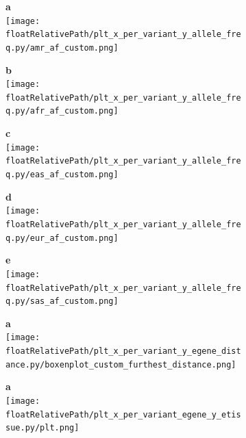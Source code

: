 \begin{figure}[!tbp]

    \begin{subfigure}[]{.49\textwidth}
        \textbf{a}
        \\
        \texttt{[image: \\floatRelativePath/plt\_x\_per\_variant\_y\_allele\_freq.py/amr\_af\_custom.png]}
    \end{subfigure}
%
    \begin{subfigure}[]{.49\textwidth}
        \textbf{b}
        \\
        \texttt{[image: \\floatRelativePath/plt\_x\_per\_variant\_y\_allele\_freq.py/afr\_af\_custom.png]}
    \end{subfigure}

    \begin{subfigure}[]{.49\textwidth}
        \textbf{c}
        \\
        \texttt{[image: \\floatRelativePath/plt\_x\_per\_variant\_y\_allele\_freq.py/eas\_af\_custom.png]}
    \end{subfigure}
%
    \centering
    \begin{subfigure}[]{.49\textwidth}
        \textbf{d}
        \\
        \texttt{[image: \\floatRelativePath/plt\_x\_per\_variant\_y\_allele\_freq.py/eur\_af\_custom.png]}
    \end{subfigure}

    \begin{subfigure}[]{.49\textwidth}
        \textbf{e}
        \\
        \texttt{[image: \\floatRelativePath/plt\_x\_per\_variant\_y\_allele\_freq.py/sas\_af\_custom.png]}
    \end{subfigure}

    \caption{}

\end{figure}


\begin{figure}[!ht]

    \begin{subfigure}[]{.49\textwidth}
        \centering
        \textbf{a}
        \\
        \texttt{[image: \\floatRelativePath/plt\_x\_per\_variant\_y\_egene\_distance.py/boxenplot\_custom\_furthest\_distance.png]}
    \end{subfigure}

    \caption{}

\end{figure}


\begin{figure}[!ht]

    \begin{subfigure}[]{.49\textwidth}
        \textbf{a}
        \\
        \texttt{[image: \\floatRelativePath/plt\_x\_per\_variant\_egene\_y\_etissue.py/plt.png]}
    \end{subfigure}

    \caption{}

\end{figure}



